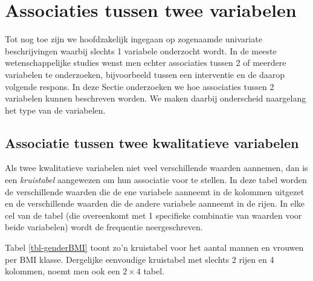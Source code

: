 \documentclass[
  dutch,
  letterpaper,
  12pt]{book}
\theoremstyle{definition}
\theoremstyle{definition}
\theoremstyle{definition}
\theoremstyle{remark}
\begin{document}
\section{Associaties tussen twee
variabelen}\label{associaties-tussen-twee-variabelen}

Tot nog toe zijn we hoofdzakelijk ingegaan op zogenaamde univariate
beschrijvingen waarbij slechts 1 variabele onderzocht wordt. In de
meeste wetenschappelijke studies wenst men echter associaties tussen 2
of meerdere variabelen te onderzoeken, bijvoorbeeld tussen een
interventie en de daarop volgende respons. In deze Sectie onderzoeken we
hoe associaties tussen 2 variabelen kunnen beschreven worden. We maken
daarbij onderscheid naargelang het type van de variabelen.

\subsection{Associatie tussen twee kwalitatieve
variabelen}\label{sec-kruistabel}

Als twee kwalitatieve variabelen niet veel verschillende waarden
aannemen, dan is een \emph{kruistabel} aangewezen om hun associatie voor
te stellen. In deze tabel worden de verschillende waarden die de ene
variabele aanneemt in de kolommen uitgezet en de verschillende waarden
die de andere variabele aanneemt in de rijen. In elke cel van de tabel
(die overeenkomt met 1 specifieke combinatie van waarden voor beide
variabelen) wordt de frequentie neergeschreven.

\begin{table}

\caption{\label{tbl-genderBMI}}


\end{table}%

Tabel \ref{tbl-genderBMI} toont zo'n kruistabel voor het aantal mannen
en vrouwen per BMI klasse. Dergelijke eenvoudige kruistabel met slechts
2 rijen en 4 kolommen, noemt men ook een \(2\times 4\) tabel.
\end{document}
